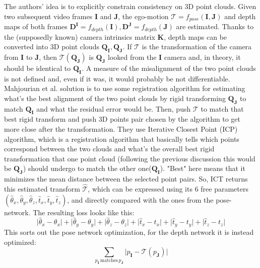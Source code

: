The authors' idea is to explicitly constrain consistency on 3D point clouds.
Given two subsequent video frames $\mathbf{I}$ and $\mathbf{J}$, the ego-motion $\mathcal{T} = f_{pose}(\mathbf{I}, \mathbf{J})$ and depth maps of both frames $\mathbf{D}^{\mathbf{I}} = f_{depth}(\mathbf{I}), \mathbf{D}^{\mathbf{J}} = f_{depth}(\mathbf{J})$ are estimated.
Thanks to the (supposedly known) camera intrinsics matrix $\mathbf{K}$, depth maps can be converted into 3D point clouds $\mathbf{Q}_{\mathbf{I}}, \mathbf{Q}_{\mathbf{J}}$.
If $\mathcal{T}$ is the transformation of the camera from $\mathbf{I}$ to $\mathbf{J}$, then $\mathcal{T} ( \mathbf{Q}_{\mathbf{J}} )$ is $\mathbf{Q}_{\mathbf{J}}$ looked from the $\mathbf{I}$ camera and, in theory, it should be identical to $\mathbf{Q}_{\mathbf{I}}$.
A measure of the misalignment of the two point clouds is not defined and, even if it was, it would probably be not differentiable.
Mahjourian et al. solution is to use some registration algorithm for estimating what's the best alignment of the two point clouds by rigid transforming $\mathbf{Q}_{\mathbf{J}}$ to match $\mathbf{Q}_{\mathbf{I}}$ and what the residual error would be.
Then, push $\mathcal{T}$ to match that best rigid transform and push 3D points pair chosen by the algorithm to get more close after the transformation.
They use Iterative Closest Point (ICP) algorithm, which is a registration algorithm that basically tells which points correspond between the two clouds and what's the overall best rigid transformation that one point cloud (following the previous discussion this would be $\mathbf{Q}_{\mathbf{J}}$) should undergo to match the other one($\mathbf{Q}_{\mathbf{I}}$).
"Best" here means that it minimizes the mean distance between the selected point pairs.
So, ICT returns this estimated transform $\hat{\mathcal{T}}$, which can be expressed using its 6 free parameters $(\hat{\theta}_{x}, \hat{\theta}_{y}, \hat{\theta}_{z}, \hat{t}_{x}, \hat{t}_{y}, \hat{t}_{z})$, and directly compared with the ones from the pose-network.
The resulting loss looks like this:
\[
	\big| \hat{\theta}_{x} - \theta_{x} \big| +
	\big| \hat{\theta}_{y} - \theta_{y} \big| +
	\big| \hat{\theta}_{z} - \theta_{z} \big| +
	\big| \hat{t}_{x} - t_{x} \big| +
	\big| \hat{t}_{y} - t_{y} \big| +
	\big| \hat{t}_{z} - t_{z} \big|
\]
This sorts out the pose network optimization, for the depth network it is instead optimized:
\[
	\sum_{p_{\mathbf{I}} \, \text{matches} \, p_{\mathbf{J}}} \big| p_{\mathbf{I}} - \mathcal{T} (p_{\mathbf{J}}) \big|
\]

